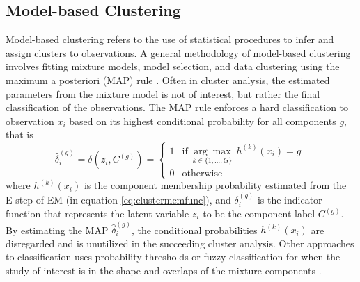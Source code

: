 \subsection{Model-based Clustering}
\label{sec:modelbasedclustering}
Model-based clustering refers to the use of statistical procedures to infer and assign clusters to observations. A general methodology of model-based clustering involves fitting mixture models, model selection, and data clustering using the maximum a posteriori (MAP) rule \cite{Baudry2015, Bulla2013}. Often in cluster analysis, the estimated parameters from the mixture model is not of interest, but rather the final classification of the observations. The MAP rule enforces a hard classification to observation $x_i$ based on its highest conditional probability for all components $g$, that is
\begin{equation*}
    \hat{\delta }^{( g)}_{i} =\delta \left(\hat{z}_{i} ,C^{( g)}\right) =\begin{cases}
    1 & \text{if }\underset{k\in \{1,\dotsc ,G\}}{\arg\max}\; h^{( k)}( x_{i}) =g\ \\
    0 & \text{otherwise}
    \end{cases}
\end{equation*}
where $h^{( k)}( x_{i})$ is the component membership probability estimated from the E-step of EM (in equation \ref{eq:clustermemfunc}), and $\delta^{( g)}_{i}$ is the indicator function that represents the latent variable $z_i$ to be the component label $C^{(g)}$. By estimating the MAP $\hat{\delta }^{( g)}_{i}$, the conditional probabilities $h^{( k)}( x_{i})$ are disregarded and is unutilized in the succeeding cluster analysis. Other approaches to classification uses probability thresholds or fuzzy classification for when the study of interest is in the shape and overlaps of the mixture components \cite{Baudry2012}.

